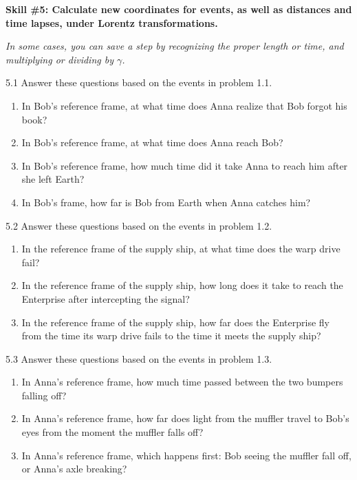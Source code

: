 \pagebreak

\textbf{Skill \#5: Calculate new coordinates for events, as well as distances and time lapses, under Lorentz transformations.}

\textit{In some cases, you can save a step by recognizing the proper length or time, and multiplying or dividing by $\gamma$.}

5.1 Answer these questions based on the events in problem 1.1.
\begin{enumerate}[nosep,label=(\emph{\alph*})]
\item In Bob's reference frame, at what time does Anna realize that Bob forgot his book?
\answerspace{0.3in}

\item In Bob's reference frame, at what time does Anna reach Bob?
\answerspace{0.3in}

\item In Bob's reference frame, how much time did it take Anna to reach him after she left Earth?
\answerspace{0.3in}

\item In Bob's frame, how far is Bob from Earth when Anna catches him?
\answerspace{0.3in}

\end{enumerate}

5.2 Answer these questions based on the events in problem 1.2.
\begin{enumerate}[nosep,label=(\emph{\alph*})]
\item In the reference frame of the supply ship, at what time does the warp drive fail?
\answerspace{0.3in}

\item In the reference frame of the supply ship, how long does it take to reach the Enterprise after intercepting the signal?
\answerspace{0.3in}

\item In the reference frame of the supply ship, how far does the Enterprise fly from the time its warp drive fails to the time it meets the supply ship?
\answerspace{0.3in}
\end{enumerate}

5.3 Answer these questions based on the events in problem 1.3.
\begin{enumerate}[nosep,label=(\emph{\alph*})]
\item In Anna's reference frame, how much time passed between the two bumpers falling off?
\answerspace{0.3in}

\item In Anna's reference frame, how far does light from the muffler travel to Bob's eyes from the moment the muffler falls off?
\answerspace{0.3in}

\item In Anna's reference frame, which happens first: Bob seeing the muffler fall off, or Anna's axle breaking?
\answerspace{0.3in}

\end{enumerate}

